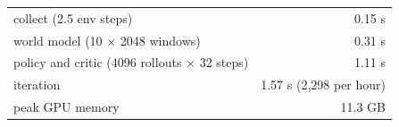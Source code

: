 \begin{tabular}{lr}\toprule
collect (2.5 env steps) & 0.15 s \\
world model (10 $\times$ 2048 windows) & 0.31 s \\
policy and critic (4096 rollouts $\times$ 32 steps) & 1.11 s \\\midrule
iteration & 1.57 s (2,298 per hour) \\
peak GPU memory & 11.3 GB \\
\bottomrule\end{tabular}
